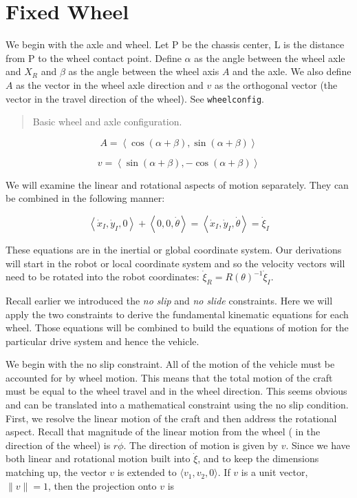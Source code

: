 \hypertarget{fixed-wheel}{%
\section{Fixed Wheel}\label{fixed-wheel}}

We begin with the axle and wheel. Let P be the chassis center, L is the
distance from P to the wheel contact point. Define \(\alpha\) as the
angle between the wheel axle and \(X_R\) and \(\beta\) as the angle
between the wheel axis \(A\) and the axle. We also define \(A\) as the
vector in the wheel axle direction and \(v\) as the orthogonal vector
(the vector in the travel direction of the wheel). See
\texttt{wheelconfig}.

\begin{quote}
Basic wheel and axle configuration.
\end{quote}

\[A = \left\langle \cos(\alpha+\beta) , \sin(\alpha+\beta) \right\rangle\]

\[v = \left\langle \sin(\alpha+\beta) , -\cos(\alpha+\beta) \right\rangle\]

We will examine the linear and rotational aspects of motion separately.
They can be combined in the following manner:

\[\left\langle \dot{x}_I , \dot{y}_I , 0 \right\rangle + \left\langle 0 , 0 , \dot{\theta} \right\rangle =
\left\langle \dot{x}_I , \dot{y}_I , \dot{\theta} \right\rangle = \dot{\xi}_I\]

These equations are in the inertial or global coordinate system. Our
derivations will start in the robot or local coordinate system and so
the velocity vectors will need to be rotated into the robot coordinates:
\(\dot{\xi}_R = R(\theta)^{-1}\dot{\xi}_I\).

Recall earlier we introduced the \emph{no slip} and \emph{no slide}
constraints. Here we will apply the two constraints to derive the
fundamental kinematic equations for each wheel. Those equations will be
combined to build the equations of motion for the particular drive
system and hence the vehicle.

We begin with the no slip constraint. All of the motion of the vehicle
must be accounted for by wheel motion. This means that the total motion
of the craft must be equal to the wheel travel and in the wheel
direction. This seems obvious and can be translated into a mathematical
constraint using the no slip condition. First, we resolve the linear
motion of the craft and then address the rotational aspect. Recall that
magnitude of the linear motion from the wheel ( in the direction of the
wheel) is \(r\dot{\phi}\). The direction of motion is given by \(v\).
Since we have both linear and rotational motion built into
\(\dot{\xi}\), and to keep the dimensions matching up, the vector \(v\)
is extended to \(\langle v_1, v_2, 0 \rangle\). If \(v\) is a unit
vector, \(\| v \| = 1\), then the projection onto \(v\) is

